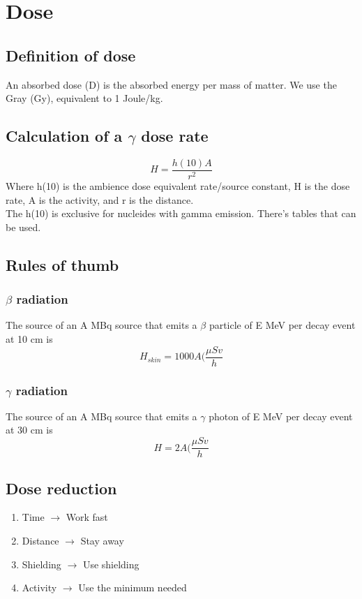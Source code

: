 \section{Dose}
\subsection{Definition of dose}
An absorbed dose (D) is the absorbed energy per mass of matter. We use the Gray (Gy), equivalent to 1 Joule/kg.
\subsection{Calculation of a $\gamma$ dose rate}
\[ H = \frac{h(10)A}{r^2} \]
Where h(10) is the ambience dose equivalent rate/source constant, H is the dose rate, A is the activity, and r is the distance.\\
The h(10) is exclusive for nucleides with gamma emission. There's tables that can be used.
\subsection{Rules of thumb}

\subsubsection{$\beta$ radiation}
The source of an A MBq source that emits a $\beta$ particle of E MeV per decay event at 10 cm is
\[ H_{skin} = 1000A (\frac{\mu Sv}{h} \]

\subsubsection{$\gamma$ radiation}
The source of an A MBq source that emits a $\gamma$ photon of E MeV per decay event at 30 cm is
\[ H = 2A (\frac{\mu Sv}{h} \]

\subsection{Dose reduction}
 \begin{enumerate}
	\item Time $\rightarrow$ Work fast
	\item Distance $\rightarrow$ Stay away
	\item Shielding $\rightarrow$ Use shielding
	\item Activity $\rightarrow$ Use the minimum needed
\end{enumerate}

